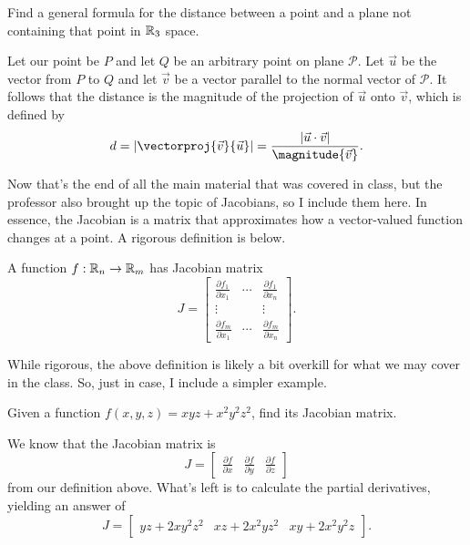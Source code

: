 \documentclass[12pt]{scrartcl}
\begin{document}
\begin{example}
    Find a general formula for the distance between a point and a plane not containing that point in $\mathbb R_{3}$ space.

    \begin{soln}
        Let our point be $P$ and let $Q$ be an arbitrary point on plane $\mathcal{P}$. Let $\vec{u}$ be the vector from $P$ to $Q$ and let $\vec{v}$ be a vector parallel to the normal vector of $\mathcal{P}$. It follows that the distance is the magnitude of the projection of $\vec{u}$ onto $\vec{v}$, which is defined by
        \[d = \abs{\vectorproj{\vec{v}}{\vec{u}}} = \frac{\abs{\vec{u} \cdot \vec{v}}}{\magnitude{\vec{v}}}.\]
    \end{soln}
\end{example}

Now that's the end of all the main material that was covered in class, but the professor also brought up the topic of Jacobians, so I include them here. In essence, the Jacobian is a matrix that approximates how a vector-valued function changes at a point. A rigorous definition is below.

\begin{definition}
    A function $f : \mathbb R_{n} \to \mathbb R_{m}$ has Jacobian matrix
    \[J = \begin{bmatrix}
        \frac{\partial f_{1}}{\partial x_{1}} & \cdots & \frac{\partial f_{1}}{\partial x_{n}} \\
        \vdots & & \vdots \\
        \frac{\partial f_{m}}{\partial x_{1}} & \cdots & \frac{\partial f_{m}}{\partial x_{n}}
    \end{bmatrix}.\]
\end{definition}

While rigorous, the above definition is likely a bit overkill for what we may cover in the class. So, just in case, I include a simpler example.

\begin{example}
    Given a function $f(x, y, z) = xyz + x^{2}y^{2}z^{2}$, find its Jacobian matrix.

    \begin{soln}
        We know that the Jacobian matrix is
        \[J = \begin{bmatrix}
            \frac{\partial f}{\partial x} & \frac{\partial f}{\partial y} & \frac{\partial f}{\partial z}
        \end{bmatrix}\]
        from our definition above. What's left is to calculate the partial derivatives, yielding an answer of
        \[J = \begin{bmatrix}
            yz + 2xy^{2}z^{2} & xz + 2x^{2}yz^{2} & xy + 2x^{2}y^{2}z
        \end{bmatrix}.\]
    \end{soln}
\end{example}
\end{document}
